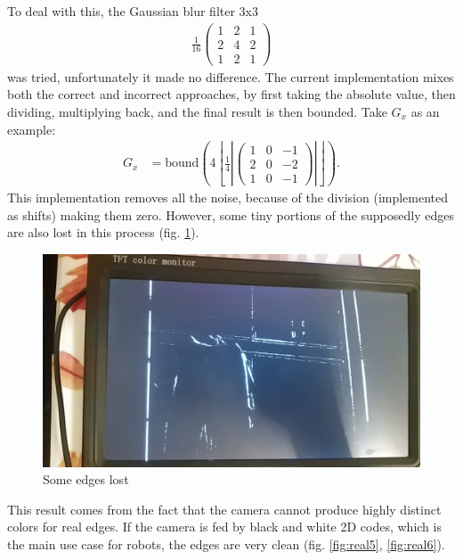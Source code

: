 \documentclass{IEEEtran}
\begin{document}
To deal with this, the Gaussian blur filter 3x3 
	\begin{align*}
		\frac{1}{16}
		\begin{pmatrix}
			1&2&1\\
			2&4&2\\
			1&2&1
		\end{pmatrix}
	\end{align*}
	was tried, unfortunately it made no difference.
	The current implementation mixes both the correct and incorrect approaches, by first taking the absolute value, then dividing, multiplying back, and the final result is then bounded. Take $G_x$ as an example:
	\begin{align*}
		G_x&=\text{bound}\left(4\left\lfloor{ \frac{1}{4}\left |
		\begin{pmatrix}
			1&0&-1\\
			2&0&-2\\
			1&0&-1
		\end{pmatrix}\right|} \right\rfloor
		\right).
	\end{align*}
	 This implementation removes all the noise, because of the division (implemented as shifts) making them zero. However, some tiny portions of the supposedly edges are also lost in this process (fig. \ref{fig:real4}).
\begin{figure}[h]
		\centering
		\includegraphics[scale=0.095]{real4}
		\caption{Some edges lost}
		\label{fig:real4}
	\end{figure}
	 This result comes from the fact that the camera cannot produce highly distinct colors for real edges. If the camera is fed by black and white 2D codes, which is the main use case for robots, the edges are very clean (fig. \ref{fig:real5}, \ref{fig:real6}).
\end{document}
